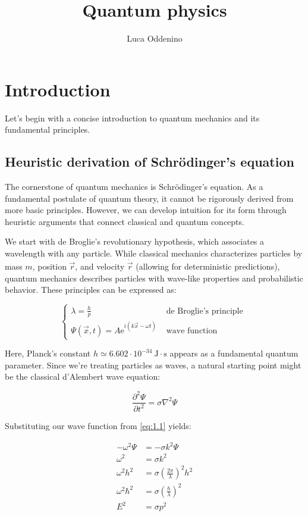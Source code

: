 \documentclass[italian]{HKNdocument}
\title{Quantum physics}
\author{Luca Oddenino}
\begin{document}
\frontmatter
\maketitle

\tableofcontents
\clearpage
\mainmatter

\section{Introduction}
Let's begin with a concise introduction to quantum mechanics and its fundamental principles.

\subsection{Heuristic derivation of Schrödinger's equation}
The cornerstone of quantum mechanics is Schrödinger's equation. As a fundamental postulate of quantum theory, it cannot be rigorously derived from more basic principles. However, we can develop intuition for its form through heuristic arguments that connect classical and quantum concepts.

We start with de Broglie's revolutionary hypothesis, which associates a wavelength with any particle. While classical mechanics characterizes particles by mass $m$, position $\vec{r}$, and velocity $\dot{\vec{r}}$ (allowing for deterministic predictions), quantum mechanics describes particles with wave-like properties and probabilistic behavior. These principles can be expressed as:

\[
\begin{cases}\lambda=\frac{h}{p} & \text { de Broglie's principle }  \label{eq:1.1}\\ \Psi(\vec{x}, t)=A \mathrm{e}^{i(k \vec{x}-\omega t)} & \text { wave function }\end{cases}
\]

Here, Planck's constant $h \simeq 6.602 \cdot 10^{-34} \mathrm{~J} \cdot \mathrm{s}$ appears as a fundamental quantum parameter. Since we're treating particles as waves, a natural starting point might be the classical d'Alembert wave equation:

\begin{equation}
\frac{\partial^{2} \Psi}{\partial t^{2}}=\sigma \nabla^{2} \Psi \label{eq:1.2}
\end{equation}

Substituting our wave function from \eqref{eq:1.1} yields:

\begin{align}
-\omega^{2} \Psi & =-\sigma k^{2} \Psi \\
\omega^{2} & =\sigma k^{2} \\
\omega^{2} h^{2} & =\sigma\left(\frac{2 \pi}{\lambda}\right)^{2} h^{2}  \label{eq:1.3}\\
\omega^{2} \hbar^{2} & =\sigma\left(\frac{h}{\lambda}\right)^{2} \\
E^{2} & =\sigma p^{2}
\end{align}
\end{document}
